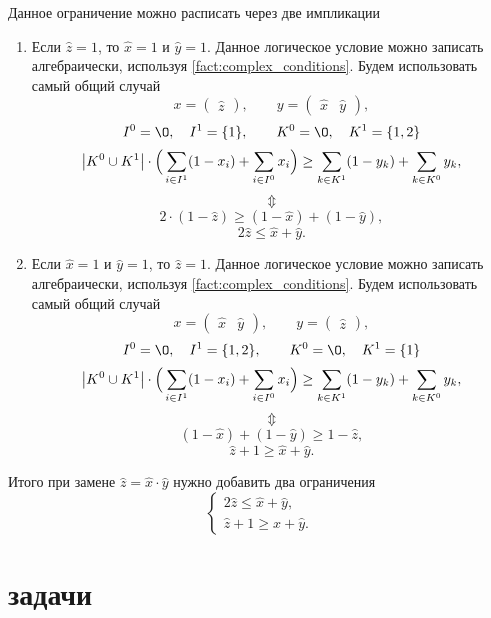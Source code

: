 Данное ограничение можно расписать через две импликации
\begin{enumerate}
	\item Если $\hat{z} = 1$, то $\hat{x} = 1$ и $\hat{y} = 1$. Данное логическое условие можно записать алгебраически, используя \cref{fact:complex_conditions}. Будем использовать самый общий случай
	\[
		x = \begin{pmatrix}\hat{z}\end{pmatrix}, \qquad y = \begin{pmatrix} \hat{x} & \hat{y} \end{pmatrix},
	\]
	\[
		I^0 = \O, \quad I^1 = \{1\}, \qquad K^0 = \O, \quad K^1 = \{1, 2\}
	\]
	\[
		\abs{K^0 \cup K^1} \cdot \Big(\sum_{i \in I^1}(1-x_i) + \sum_{i \in I^0}x_i\Big) \ge \sum_{k \in K^1}(1-y_k) + \sum_{k \in K^0}y_k,
	\]	
	\[\Updownarrow\]	
	\[
		2 \cdot (1 - \hat{z}) \ge (1 - \hat{x}) + (1 - \hat{y}),
	\]
	\[
		2\hat{z} \le \hat{x} + \hat{y}.
	\]
	
	\item Если $\hat{x} = 1$ и $\hat{y} = 1$, то $\hat{z} = 1$. Данное логическое условие можно записать алгебраически, используя \cref{fact:complex_conditions}. Будем использовать самый общий случай
	\[
		x = \begin{pmatrix}\hat{x} & \hat{y}\end{pmatrix}, \qquad y = \begin{pmatrix} \hat{z} \end{pmatrix},
	\]
	\[
		I^0 = \O, \quad I^1 = \{1, 2\}, \qquad K^0 = \O, \quad K^1 = \{1\}
	\]
	\[
		\abs{K^0 \cup K^1} \cdot \Big(\sum_{i \in I^1}(1-x_i) + \sum_{i \in I^0}x_i\Big) \ge \sum_{k \in K^1}(1-y_k) + \sum_{k \in K^0}y_k,
	\]
	\[\Updownarrow\]
	\[
		(1 - \hat{x}) + (1 - \hat{y}) \ge 1 - \hat{z},
	\]
	\[
		\hat{z} + 1 \ge \hat{x} + \hat{y}.
	\]
\end{enumerate}

Итого при замене $\hat{z} = \hat{x} \cdot \hat{y}$ нужно добавить два ограничения
\[
	\boxed{\begin{cases}
		2\hat{z} \le \hat{x} + \hat{y}, \\
			\hat{z} + 1 \ge \hat{x} + \hat{y}.
	\end{cases}}
\]

\section{задачи}


